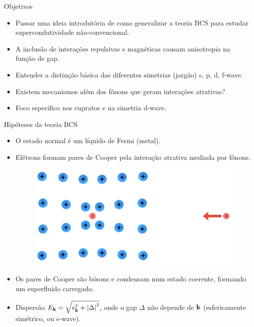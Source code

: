 \documentclass[8pt,aspectratio=169,xcolor={table,dvipsnames,usenames}]{beamer}
\begin{document}

\begin{frame}{Objetivos}

\begin{itemize}
\item Passar uma ideia introdutória de como generalizar a teoria BCS para estudar supercondutividade não-convencional.

\n\n

\item A inclusão de interações repulsivas e magnéticas causam anisotropia na função de gap.

\n\n

\item Entender a distinção básica das diferentes simetrias (jargão) s, p, d, f-wave.

\n\n

\item Existem mecanismos além dos fônons que geram interações atrativas?

\n\n

\item Foco específico nos cupratos e na simetria d-wave.
\end{itemize}



\end{frame}

\begin{frame}{Hipóteses da teoria BCS}

\begin{itemize}
\item O estado normal é um líquido de Fermi (metal).

\item Elétrons formam pares de Cooper pela interação atrativa mediada por fônons.

\n

\begin{figure}[H]
\centering
\includegraphics[width=0.5\linewidth]{fig/phonon.png}
\label{fig:phonon}
\end{figure}

\n

\item Os pares de Cooper são bósons e condensam num estado coerente, formando um superfluido carregado.

\item Dispersão $E_{\vb{k}} = \sqrt{\epsilon_{\vb{k}}^2 + \abs{\Delta}^2}$, onde o gap $\Delta$ não depende de $\vb{k}$ (esfericamente simétrico, ou s-wave).
\end{itemize}

\end{frame}
\end{document}
